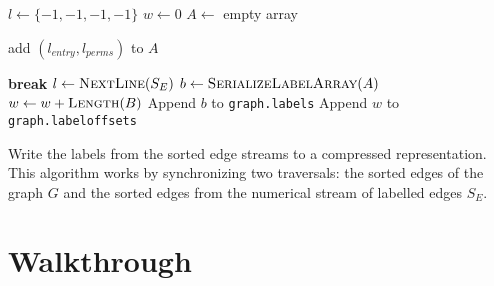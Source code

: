 \begin{algorithm}[t]
    \begin{algorithmic}
        \State $l \gets \{-1, -1, -1, -1\}$ 
         
            \State $w \gets 0$ 
             
                \State $A \gets$ empty array 
                 

                     
                        \State add $(l_\mathit{entry}, l_\mathit{perms})$ to $A$
                    \EndIf

                     
                        \State \textbf{break}
                    \Else
                        \State $l \gets \Call{NextLine}{S_E}$
                    \EndIf
                \EndWhile
                \State $b \gets \Call{SerializeLabelArray}{A}$
                \State $w \gets w + \Call{Length}{B}$
                \State Append $b$ to \texttt{graph.labels}
            \EndFor
            \State Append $w$ to \texttt{graph.labeloffsets}
        \EndFor
        \EndFunction
    \end{algorithmic}

    \caption{Write the labels from the sorted edge streams to a compressed
    representation. This algorithm works by synchronizing two traversals: the
sorted edges of the graph $G$ and the sorted edges from the numerical stream of
labelled edges $S_E$.}%
    \label{algo:label-writing}
\end{algorithm}

\section{Walkthrough}


